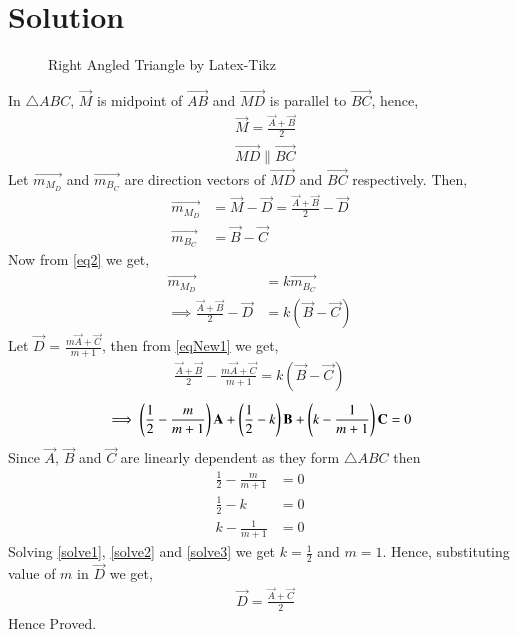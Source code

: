 \documentclass[journal,12pt,twocolumn]{IEEEtran}
\begin{document}
\section{Solution}
\renewcommand{\thefigure}{1}
\begin{figure}[!h]
\centering
{}
\caption{Right Angled Triangle by Latex-Tikz}
\label{myfig}
\end{figure}
In $\triangle{ABC}$, $\vec{M}$ is midpoint of $\vec{AB}$ and $\vec{MD}$ is parallel to $\vec{BC}$, hence,
\begin{align}
&\vec{M} = \frac{\vec{A}+\vec{B}}{2}\label{eq1}\\
&\vec{MD} \parallel \vec{BC}\label{eq2}
\end{align}
Let $\vec{m_M_D}$ and $\vec{m_B_C}$ are direction vectors of $\vec{MD}$ and $\vec{BC}$ respectively. Then,
\begin{align}
\vec{m_M_D} &= \vec{M} - \vec{D} = \frac{\vec{A}+\vec{B}}{2} - \vec{D}\\
\vec{m_B_C} &= \vec{B} - \vec{C}
\end{align}
Now from \eqref{eq2} we get,
\begin{align}
\vec{m_M_D} &= k\vec{m_B_C}\\
\implies\frac{\vec{A}+\vec{B}}{2} - \vec{D} &= k(\vec{B} - \vec{C})\label{eqNew1}
\end{align}
Let $\vec{D}$ = $\frac{m\vec{A}+\vec{C}}{m+1}$, then from \eqref{eqNew1} we get,
\begin{align}
\frac{\vec{A}+\vec{B}}{2} - \frac{m\vec{A}+\vec{C}}{m+1} = k(\vec{B} - \vec{C})
\end{align}
\begin{align}
\implies\left(\frac{1}{2}-\frac{m}{m+1}\right)\mathbf{A}+\left(\frac{1}{2}-k\right)\mathbf{B}+\left(k-\frac{1}{m+1}\right)\mathbf{C} =0
\end{align}
Since $\vec{A}$, $\vec{B}$ and $\vec{C}$ are linearly dependent as they form $\triangle{ABC}$ then 
\begin{align}
\frac{1}{2}-\frac{m}{m+1} &= 0\label{solve1}\\
\frac{1}{2}-k & = 0\label{solve2}\\
k-\frac{1}{m+1} &= 0\label{solve3}
\end{align}
Solving \eqref{solve1}, \eqref{solve2} and \eqref{solve3} we get $k=\frac{1}{2}$ and $m = 1$. Hence, substituting value of $m$ in $\vec{D}$ we get,
\begin{align}
&\vec{D} = \frac{\vec{A}+\vec{C}}{2}\label{eq3}
\end{align}
Hence Proved.\\
\end{document}
